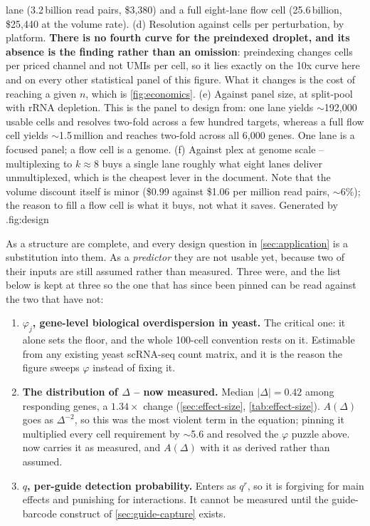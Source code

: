 {  lane (3.2\,billion read pairs, \$3{,}380) and a full eight-lane flow cell
  (25.6\,billion, \$25{,}440 at the volume rate). (d) Resolution against cells per
  perturbation, by platform. \textbf{There is no fourth curve for the preindexed
  droplet, and its absence is the finding rather than an omission}: preindexing
  changes cells per priced channel and not UMIs per cell, so it lies exactly on
  the 10x curve here and on every other statistical panel of this figure. What it
  changes is the cost of reaching a given $n$, which is \cref{fig:economics}. (e) Against panel size, at split-pool with rRNA
  depletion. This is the panel to design from: one lane yields
  $\sim$192{,}000 usable cells and resolves two-fold across a few hundred
  targets, whereas a full flow cell yields $\sim$1.5\,million and reaches two-fold
  across all 6{,}000 genes. One lane is a focused panel; a flow cell is a genome.
  (f) Against plex at genome scale -- multiplexing to $k\approx8$ buys a single
  lane roughly what eight lanes deliver unmultiplexed, which is the cheapest lever
  in the document. Note that the volume discount itself is minor (\$0.99 against
  \$1.06 per million read pairs, $\sim$6\%); the reason to fill a flow cell is
  what it buys, not what it saves. Generated by
  .}{fig:design}

 As a structure
 are complete, and every design question in
\cref{sec:application} is a substitution into them. As a \emph{predictor} they are
not usable yet, because two of their inputs are still assumed rather than
measured. Three were, and the list below is kept at three so the one that has
since been pinned can be read against the two that have not:

\begin{enumerate}[leftmargin=1.4em,itemsep=1pt,topsep=2pt]
  \item \textbf{$\varphi_j$, gene-level biological overdispersion in yeast.} The
    critical one: it alone sets the floor, and the whole 100-cell convention rests
    on it. Estimable from any existing yeast scRNA-seq count matrix, and it is
    the reason the figure sweeps $\varphi$ instead of fixing it.
  \item \textbf{The distribution of $\Delta$ -- now measured.} Median
    $|\Delta|=0.42$ among responding genes, a $1.34\times$ change
    (\cref{sec:effect-size}, \cref{tab:effect-size}). $A(\Delta)$ goes as
    $\Delta^{-2}$, so this was the most violent term in the equation; pinning it
    multiplied every cell requirement by $\sim$5.6 and resolved the $\varphi$
    puzzle above.  now carries it as measured, and
    $A(\Delta)$ with it as derived rather than assumed.
  \item \textbf{$q$, per-guide detection probability.} Enters as $q^{r}$, so it
    is forgiving for main effects and punishing for interactions. It cannot be
    measured until the guide-barcode construct of \cref{sec:guide-capture}
    exists.
\end{enumerate}


